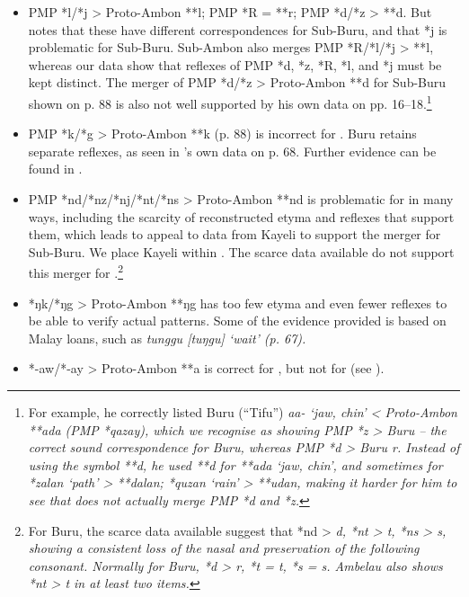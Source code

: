 \begin{itemize}

\item PMP *l/*j > Proto-Ambon **l; PMP *R = **r; PMP *d/*z > **d.
But \citet[17]{Stresemann1927} notes that these have different
correspondences for Sub-Buru, and that *j is problematic for Sub-Buru.
Sub-Ambon also merges PMP *R/*l/*j > **l,
whereas our  data show that reflexes of PMP *d,
*z, *R, *l, and *j must be kept distinct.
The merger of PMP *d/*z > Proto-Ambon **d for Sub-Buru shown on p.
88 is also not well supported by his own data on pp.
16--18.\footnote{
		For example, he correctly listed Buru (``Tifu'')
		\it{aa-} ‘jaw, chin’ < Proto-Ambon **ada (PMP *qazay),
		which we recognise as showing PMP *z > Buru {\0} -- the correct
		sound correspondence for Buru,
		whereas PMP *d > Buru \it{r}.
		Instead of using the symbol **d{\Q},
		he used **d for **ada ‘jaw,
		chin’, and sometimes for *zalan ‘path’ > **dalan;
		*quzan ‘rain’ > **udan,
		making it harder for him to see that  does not
		actually merge PMP *d
		and *z.}
\item PMP *k/*g > Proto-Ambon **k (p.
88) is incorrect for .
Buru retains separate reflexes,
as seen in \citeauthor{Stresemann1927}'s own data on p. 68.
Further evidence can be found in \citet{GrimesGrimes2020}.

\item PMP *nd/*nz/*nj/*nt/*ns > Proto-Ambon **nd is problematic for
 in many ways,
including the scarcity of reconstructed etyma
and reflexes that support them,
which leads \citeauthor{Stresemann1927} to appeal to data from Kayeli to support
the merger for Sub-Buru.
We place Kayeli within .
The scarce data available do not support this merger for
.\footnote{
		For Buru, the scarce data available suggest that *nd > \it{d},
		*nt > \it{t}, *ns > \it{s},
		showing a consistent loss of the nasal
		and preservation of the following consonant.
		Normally for Buru, *d > \it{r},
		*t = \it{t}, *s = \it{s}.
		Ambelau also shows *nt > \it{t} in at least two items.}

\item *ŋk/*ŋg > Proto-Ambon **ŋg has too few etyma
and even fewer reflexes to be able to verify actual patterns.
Some of the evidence provided is based on Malay loans,
such as \it{tunggu} [tuŋgu] ‘wait’ (p. 67).

\item *-aw/*-ay > Proto-Ambon **a is correct for ,
but not for  (see ).


\end{itemize}
